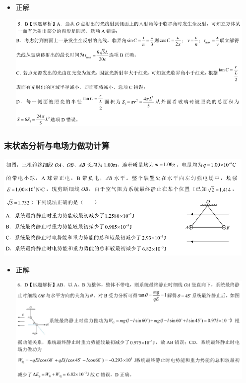 \documentclass{article}
\begin{document}
\begin{itemize}
    \item 正解
    
    \includegraphics[width=0.95\textwidth,keepaspectratio]{./pictures/3.14-2.png}

\end{itemize}



\vspace{2em}

\subsubsection{末状态分析与电场力做功计算}
\includegraphics[width=0.95\textwidth,keepaspectratio]{./pictures/3.14-3.png}

\begin{itemize}
    \item 正解
    
    \includegraphics[width=0.95\textwidth,keepaspectratio]{./pictures/3.14-4.png}

\end{itemize}
\end{document}

